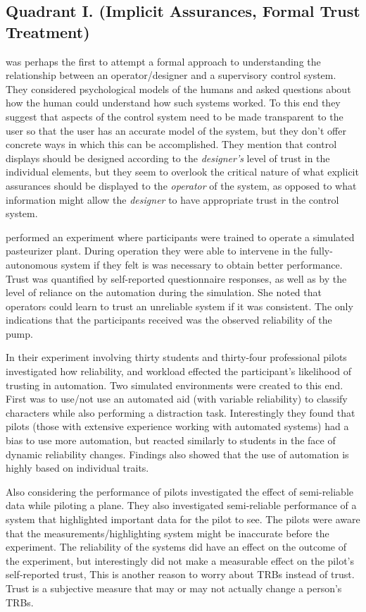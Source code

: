 \subsection{Quadrant I. (Implicit Assurances, Formal Trust Treatment)}\label{sec:q1}
\citet{Sheridan1984-kx} was perhaps the first to attempt a formal approach to understanding the relationship between an operator/designer and a supervisory control system. They considered psychological models of the humans and asked questions about how the human could understand how such systems worked. To this end they suggest that aspects of the control system need to be made transparent to the user so that the user has an accurate model of the system, but they don't offer concrete ways in which this can be accomplished. They mention that control displays should be designed according to the \emph{designer's} level of trust in the individual elements, but they seem to overlook the critical nature of what explicit assurances should be displayed to the \emph{operator} of the system, as opposed to what information might allow the \emph{designer} to have appropriate trust in the control system.

\citet{Muir1996-gt} performed an experiment where participants were trained to operate a simulated pasteurizer plant. During operation they were able to intervene in the fully-autonomous system if they felt is was necessary to obtain better performance. Trust was quantified by self-reported questionnaire responses, as well as by the level of reliance on the automation during the simulation. She noted that operators could learn to trust an unreliable system if it was consistent. The only indications that the participants received was the observed reliability of the pump. 

In their experiment involving thirty students and thirty-four professional pilots \citet{Riley1996-qm} investigated how reliability, and workload effected the participant's likelihood of trusting in automation. Two simulated environments were created to this end. First was to use/not use an automated aid (with variable reliability) to classify characters while also performing a distraction task. Interestingly they found that pilots (those with extensive experience working with automated systems) had a bias to use more automation, but reacted similarly to students in the face of dynamic reliability changes. Findings also showed that the use of automation is highly based on individual traits.

Also considering the performance of pilots \citet{Wickens1999-la} investigated the effect of semi-reliable data while piloting a plane. They also investigated semi-reliable performance of a system that highlighted important data for the pilot to see. The pilots were aware that the measurements/highlighting system might be inaccurate before the experiment. The reliability of the systems did have an effect on the outcome of the experiment, but interestingly did not make a measurable effect on the pilot's self-reported trust, This is another reason to worry about TRBs instead of trust. Trust is a subjective measure that may or may not actually change a person's TRBs.

